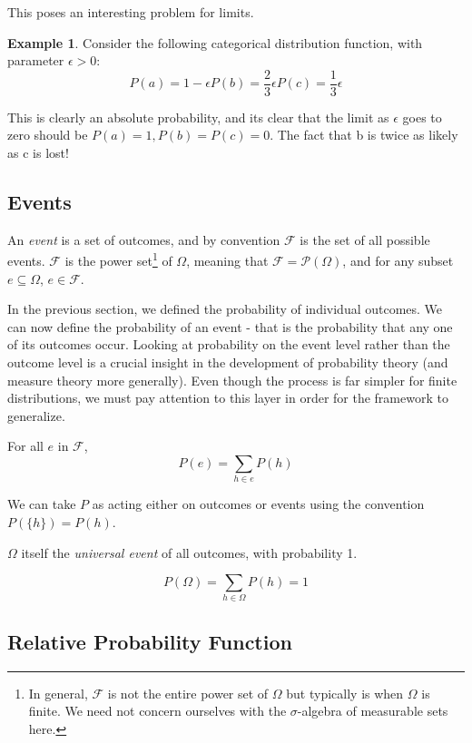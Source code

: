 \documentclass[twoside]{article}
\theoremstyle{plain}%
\theoremstyle{definition}
\newtheorem{example}{Example}[section]
\theoremstyle{remark}
\begin{document}
This poses an interesting problem for limits.

\begin{example}
\label{ex:abs_lose_info}
Consider the following categorical distribution function, with parameter \(\epsilon > 0\):
\[
P(a) = 1 - \epsilon
P(b) = \frac{2}{3}\epsilon
P(c) = \frac{1}{3}\epsilon
\]
\end{example}

This is clearly an absolute probability, and its clear that the limit as \(\epsilon\) goes to zero should be \(P(a) = 1, P(b) = P(c) = 0\). The fact that b is twice as likely as c is lost!

\subsection{Events}

An \textit{event} is a set of outcomes, and by convention \(\mathcal{F}\) is the set of all possible events. \(\mathcal{F}\) is the power set\footnote{In general, \(\mathcal{F}\) is not the entire power set of \(\Omega\) but typically is when \(\Omega\) is finite. We need not concern ourselves with the \(\sigma\)-algebra of measurable sets here.} of \(\Omega\), meaning that \(\mathcal{F} = \mathcal{P}(\Omega)\), and for any subset \(e \subseteq \Omega\), \(e \in \mathcal{F}\).

In the previous section, we defined the probability of individual outcomes. We can now define the probability of an event - that is the probability that any one of its outcomes occur.
Looking at probability on the event level rather than the outcome level is a crucial insight in the development of probability theory (and measure theory more generally). Even though the process is far simpler for finite distributions, we must pay attention to this layer in order for the framework to generalize.

For all \(e\) in \(\mathcal{F}\),
\[ P(e) = \sum_{h \in e}{P(h)}\]

We can take \(P\) as acting either on outcomes or events using the convention \(P(\{h\}) = P(h)\).

\(\Omega\) itself the \textit{universal event} of all outcomes, with probability 1.

\[P(\Omega) = \sum_{h \in \Omega}{P(h)} = 1\]

\subsection{Relative Probability Function}
\label{section:standard_relative_prob}
\end{document}
